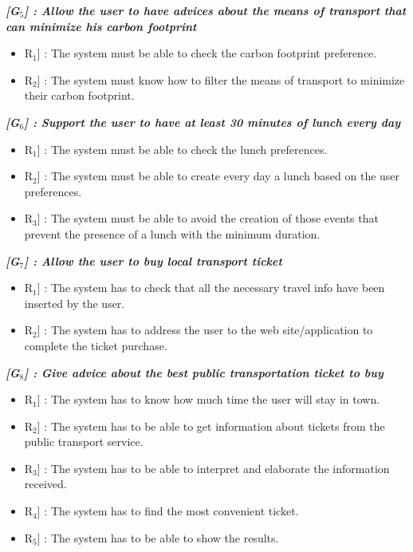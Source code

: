 \vspace{0.5cm}
\noindent
\emph{\textbf{[G$_{5}$] : Allow the user to have advices about the means of transport that can minimize his carbon footprint}}
\begin{itemize}
	\setlength{\leftskip}{0.5cm}
	\item \lbrack R$_{1}$] : The system must be able to check the carbon footprint preference.
	\item \lbrack R$_{2}$] : The system must know how to filter the means of transport to minimize their carbon footprint.
\end{itemize}

\vspace{0.5cm}
\noindent
\emph{\textbf{[G$_{6}$] : Support the user to have at least 30 minutes of lunch every day}}
\begin{itemize}
	\setlength{\leftskip}{0.5cm}
	\item \lbrack R$_{1}$] : The system must be able to check the lunch preferences.
	\item \lbrack R$_{2}$] : The system must be able to create every day a lunch based on the user preferences.
	\item \lbrack R$_{3}$] : The system must be able to avoid the creation of those events that prevent the presence of a lunch with the minimum duration.
\end{itemize}

\vspace{0.5cm}
\noindent
\emph{\textbf{[G$_{7}$] : Allow the user to buy local transport ticket}}
\begin{itemize}
	\setlength{\leftskip}{0.5cm}
	\item \lbrack R$_{1}$] : The system has to check that all the necessary travel info have been inserted by the user.
	\item \lbrack R$_{2}$] : The system has to address the user to the web site/application to complete the ticket purchase.
\end{itemize}

\vspace{0.5cm}
\noindent
\emph{\textbf{[G$_{8}$] : Give advice about the best public transportation ticket to buy}}
\begin{itemize}
	\setlength{\leftskip}{0.5cm}
	\item \lbrack R$_{1}$] : The system has to know how much time the user will stay in town.
	\item \lbrack R$_{2}$] : The system has to be able to get information about tickets from the public transport service.
	\item \lbrack R$_{3}$] : The system has to be able to interpret and elaborate the information received.
	\item \lbrack R$_{4}$] : The system has to find the most convenient ticket.
	\item \lbrack R$_{5}$] : The system has to be able to show the results.
\end{itemize}

